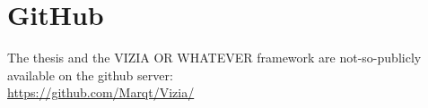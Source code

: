 
\chapter{GitHub}
The thesis and the VIZIA OR WHATEVER framework are not-so-publicly available on the github server: \\
\url{https://github.com/Marqt/Vizia/} 

